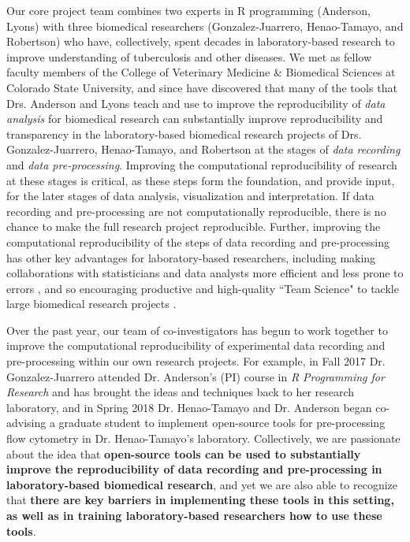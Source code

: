 \documentclass[pdftex,english,11pt,parskip=half]{scrartcl}
\begin{document}
Our core project team combines two experts in R programming
(Anderson, Lyons) with three biomedical researchers (Gonzalez-Juarrero,
Henao-Tamayo, and Robertson) who have, collectively, spent decades in
laboratory-based research to improve understanding of tuberculosis and other
diseases. We met as fellow faculty members of the College of Veterinary Medicine \& Biomedical Sciences at Colorado State
University, and since have discovered that many of the tools that Drs. Anderson
and Lyons teach and use to improve the reproducibility of \textit{data analysis}
for biomedical research can substantially improve reproducibility and
transparency in the laboratory-based biomedical research projects of Drs.
Gonzalez-Juarrero, Henao-Tamayo, and Robertson at the stages of \textit{data
recording} and \textit{data pre-processing}. Improving the computational 
reproducibility of research at these stages is critical, as these steps form the foundation, and 
provide input, for the later stages of data analysis, visualization and 
interpretation. If data recording and pre-processing are not computationally reproducible, there 
is no chance to make the full research project reproducible.
Further, improving the computational reproducibility of the steps of data recording and pre-processing has other key advantages for laboratory-based researchers, including making collaborations with
statisticians 
and data analysts more efficient and less prone to errors \cite{ellis2018share}, 
and so encouraging productive and high-quality ``Team Science" to tackle large biomedical research projects \cite{munafo2017manifesto}.

Over the past year, our team of co-investigators has begun
to work together to improve the computational reproducibility of experimental data recording and pre-processing within our own research projects. For example, in
Fall 2017 Dr. Gonzalez-Juarrero attended Dr. Anderson's (PI) course in \textit{R
Programming for Research} and has brought the ideas and techniques back to her
research laboratory, and in Spring 2018 Dr. Henao-Tamayo and Dr.
Anderson began co-advising a graduate student to implement
open-source tools for pre-processing flow cytometry in Dr. Henao-Tamayo's
laboratory. Collectively, we are passionate about the idea that
\textbf{open-source tools can be used to substantially improve the
reproducibility of data recording and pre-processing in laboratory-based
biomedical research}, and yet we are also able to recognize that \textbf{there are key barriers in
implementing these tools in this setting, as well as in training
laboratory-based researchers how to use these tools}. 
\end{document}
